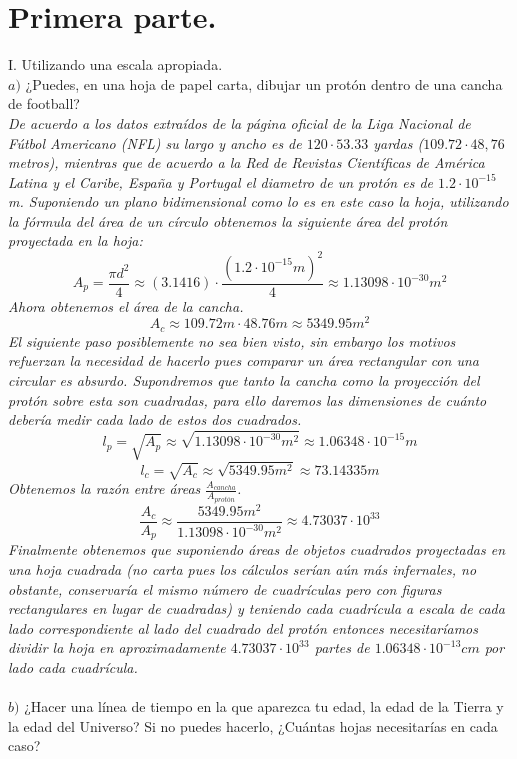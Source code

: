 \documentclass{article}
\begin{document}
\section*{Primera parte.}
I. Utilizando una escala apropiada.\\
$a)$ ¿Puedes, en una hoja de papel carta, dibujar un protón dentro de una cancha de football? \\
\textit{De acuerdo a los datos extraídos de la página oficial de la Liga Nacional de Fútbol Americano (NFL) su largo y ancho es de $120 \cdot 53.33$ yardas ($109.72 \cdot 48,76$ metros), mientras que de acuerdo a la Red de Revistas Científicas de América Latina y el Caribe, España y Portugal el diametro de un protón es de $1.2 \cdot 10^{-15}$ m. Suponiendo un plano bidimensional como lo es en este caso la hoja, utilizando la fórmula del área de un círculo obtenemos la siguiente área del protón proyectada en la hoja:}
\[ A_p = \frac{\pi d^2}{4} \approx (3.1416) \cdot \frac{(1.2 \cdot 10^{-15}m)^2}{4} \approx 1.13098 \cdot 10^{-30} m^2 \]
\textit{Ahora obtenemos el área de la cancha.}
\[ A_c \approx 109.72m \cdot 48.76m \approx 5349.95m^2\]
\textit{El siguiente paso posiblemente no sea bien visto, sin embargo los motivos refuerzan la necesidad de hacerlo pues comparar un área rectangular con una circular es absurdo. Supondremos que tanto la cancha como la proyección del protón sobre esta son cuadradas, para ello daremos las dimensiones de cuánto debería medir cada lado de estos dos cuadrados.}
\[ l_p = \sqrt{A_p} \approx \sqrt{1.13098 \cdot 10^{-30} m^2} \approx 1.06348\cdot 10^{-15}m\]
\[ l_c = \sqrt{A_c} \approx \sqrt{5349.95m^2} \approx 73.14335m\]
\textit{Obtenemos la razón entre áreas $\frac{A_{cancha}}{A_{protón}}$.}
\[ \frac{A_c}{A_p} \approx \frac{5349.95m^2}{1.13098 \cdot 10^{-30} m^2} \approx 4.73037\cdot 10^{33}\]
\textit{Finalmente obtenemos que suponiendo áreas de objetos cuadrados proyectadas en una hoja cuadrada (no carta pues los cálculos serían aún más infernales, no obstante, conservaría el mismo número de cuadrículas pero con figuras rectangulares en lugar de cuadradas) y teniendo cada cuadrícula a escala de cada lado correspondiente al lado del cuadrado del protón entonces necesitaríamos dividir la hoja en aproximadamente $4.73037\cdot 10^{33}$ partes de $1.06348\cdot 10^{-13}cm$ por lado cada cuadrícula.}\\\\
$b)$ ¿Hacer una línea de tiempo en la que aparezca tu edad, la edad de la Tierra y la edad del Universo? Si no puedes hacerlo, ¿Cuántas hojas necesitarías en cada caso?\\
\end{document}
